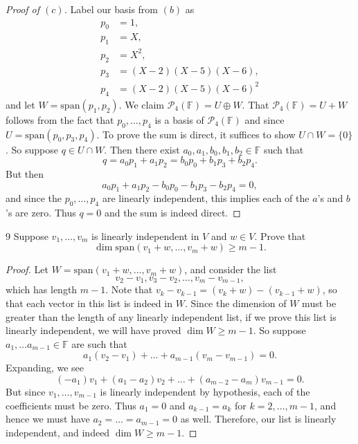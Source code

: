 \documentclass[11pt]{extarticle}
\newenvironment{problem}[1]{\begin{prob*}{#1}{}}{\end{prob*}}
\newcommand{\F}{\mathbb{F}}
\newcommand{\Span}{\mathrm{span}}
\begin{document}
\begin{proof}[Proof of $(c)$]
Label our basis from $(b)$ as
\begin{align*}
p_0 &= 1, \\ p_1 &= X,\\ p_2 &= X^2,\\ p_3 &= (X - 2)(X-5)(X-6), \\ p_4 &= (X-2)(X-5)(X-6)^2
\end{align*}
and let $W = \Span(p_1, p_2)$.  We claim $\mathcal{P}_4(\F) = U\oplus W$.  That $\mathcal{P}_4(\F) = U + W$ follows from the fact that $p_0,\dots, p_4$ is a basis of $\mathcal{P}_4(\F)$ and since $U = \Span(p_0, p_3, p_4)$.  To prove the sum is direct, it suffices to show $U\cap W=\{0\}$.  So suppose $q\in U\cap W$.  Then there exist $a_0, a_1, b_0, b_1, b_2\in\F$ such that 
\begin{equation*}
q = a_0p_1 + a_1 p_2 = b_0p_0 + b_1 p_3 + b_2 p_4.
\end{equation*}
But then
\begin{equation*}
a_0p_1 + a_1 p_2 - b_0p_0 - b_1 p_3 - b_2 p_4 = 0,
\end{equation*}
and since the $p_0,\dots,p_4$ are linearly independent, this implies each of the $a$'s and $b$'s are zero.  Thus $q=0$ and the sum is indeed direct.
\end{proof}

\begin{problem}{9}
Suppose $v_1,\dots, v_m$ is linearly independent in $V$ and $w\in V$.  Prove that 
\begin{equation*}
\dim\Span(v_1 + w, \dots, v_m + w)\geq m - 1.
\end{equation*}
\end{problem}
\begin{proof}
Let $W = \Span(v_1 + w, \dots, v_m + w)$, and consider the list
\begin{equation*}
v_2 - v_1, v_3 - v_2,\dots, v_m - v_{m-1},
\end{equation*}
which has length $m - 1$.  Note that $v_k - v_{k - 1} = (v_k + w) - (v_{k - 1} + w)$, so that each vector in this list is indeed in $W$.  Since the dimension of $W$ must be greater than the length of any linearly independent list, if we prove this list is linearly independent, we will have proved $\dim W\geq m - 1$.  So suppose $a_1,\dots a_{m - 1}\in\F$ are such that 
\begin{equation*}
a_1(v_2 - v_1) + \dots + a_{m-1}(v_m - v_{m-1}) = 0.
\end{equation*}
Expanding, we see
\begin{equation*}
(-a_1)v_1 + (a_1 - a_2)v_2 + \dots + (a_{m-2} - a_m)v_{m-1} = 0.
\end{equation*}
But since $v_1,\dots,v_{m-1}$ is linearly independent by hypothesis, each of the coefficients must be zero.  Thus $a_1 = 0$ and $a_{k-1} = a_{k}$ for $k = 2, \dots, m- 1$, and hence we must have $a_2=\dots = a_{m-1}=0$ as well.  Therefore, our list is linearly independent, and indeed $\dim W \geq m-1$.
\end{proof}
\end{document}
